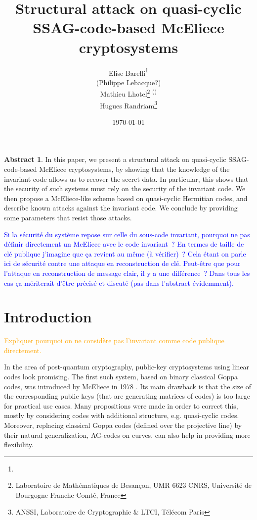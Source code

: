 \documentclass[10pt]{article}
\title{Structural attack on quasi-cyclic SSAG-code-based McEliece cryptosystems}
\author{
Elise Barelli\footnote{}\\
(Philippe Lebacque?)\\
Mathieu Lhotel\footnote{Laboratoire de Mathématiques de Besançon, UMR 6623 CNRS, Université de Bourgogne Franche-Comté, France} \textsuperscript{(\Letter)}\\
Hugues Randriam\footnote{ANSSI, Laboratoire de Cryptographie \& LTCI, Télécom Paris}
}
\date{\today}
\theoremstyle{definition}
\newtheorem*{abs}{Abstract}
\theoremstyle{definition}
\theoremstyle{definition}
\newcommand{\s}{\vspace{0.3cm}}
\newcommand{\hugues}[1]{\textcolor{blue}{#1}}
\newcommand{\note}[1]{\textcolor{orange}{#1}}
\begin{document}
\maketitle

\begin{abs} 
 In this paper, we present a structural attack on quasi-cyclic SSAG-code-based McEliece cryptosystems, by showing that the knowledge of the invariant code allows us to recover the secret data. In particular, this shows that the security of such systems must rely on the security of the invariant code. We then propose a McEliece-like scheme based on quasi-cyclic Hermitian codes, and describe known attacks against the invariant code. We conclude by providing some parameters that resist those attacks.

\hugues{
Si la sécurité du système repose sur celle du sous-code invariant, pourquoi ne pas définir directement un McEliece avec le code invariant~?
En termes de taille de clé publique j'imagine que ça revient au même (à vérifier)~?
Cela étant on parle ici de sécurité contre une attaque en reconstruction de clé.
Peut-être que pour l'attaque en reconstruction de message clair, il y a une différence~?
Dans tous les cas ça mériterait d'être précisé et discuté (pas dans l'abstract évidemment).
}
\end{abs}

\newpage



\section{Introduction}

\note{Expliquer pourquoi on ne considère pas l'invariant comme code publique directement.}

\s
In the area of post-quantum cryptography, public-key cryptosystems using linear codes look promising. The first such system, based on binary classical Goppa codes, was introduced by McEliece in 1978 \cite{McE}. Its main drawback is that the size of the corresponding public keys (that are generating matrices of codes) is too large for practical use cases. Many propositions were made in order to correct this, mostly by considering codes with additional structure, e.g. quasi-cyclic codes. Moreover, replacing classical Goppa codes (defined over the projective line) by their natural generalization, AG-codes on curves, can also help in providing more flexibility. 

\s
\end{document}

